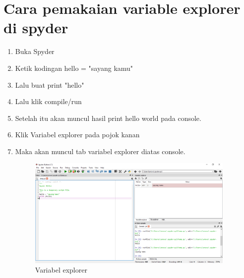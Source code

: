     \section{Cara pemakaian variable explorer di spyder}
    \begin{enumerate}
        \item Buka Spyder
        \item Ketik kodingan hello = "sayang kamu" 
        \item Lalu buat print "hello"
        \item Lalu klik compile/run
        \item Setelah itu akan muncul hasil print hello world pada console.
        \item Klik Variabel explorer pada pojok kanan
        \item Maka akan muncul tab variabel explorer diatas console.
        \begin{figure}[!htpb]
			\includegraphics[width=10cm]{figures/variable.PNG}
				\centering
			\caption{Variabel explorer}
		\end{figure}
    \end{enumerate}
    
    
    